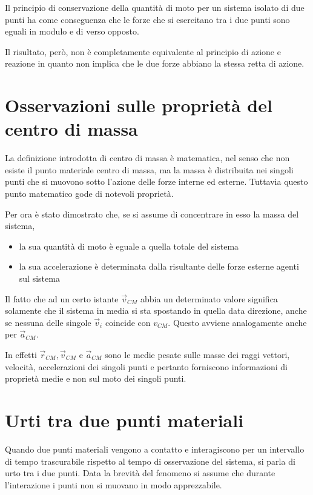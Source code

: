 \documentclass[class=book, crop=false, oneside, 12pt]{standalone}
\begin{document}
Il principio di conservazione della quantità di moto per un sistema isolato di due punti ha come conseguenza che le forze che si esercitano tra i due punti sono eguali in modulo e di verso opposto.

Il risultato, però, non è completamente equivalente al principio di azione e reazione in quanto non implica che le due forze abbiano la stessa retta di azione.

\section{Osservazioni sulle proprietà del centro di massa}

La definizione introdotta di centro di massa è matematica, nel senso che non esiste il punto materiale centro di massa, ma la massa è distribuita nei singoli punti che si muovono sotto l'azione delle forze interne ed esterne. 
Tuttavia questo punto matematico gode di notevoli proprietà.

Per ora è stato dimostrato che, se si assume di concentrare in esso la massa del sistema, 
\begin{itemize}
    \item la sua quantità di moto è eguale a quella totale del sistema
    \item la sua accelerazione è determinata dalla risultante delle forze esterne agenti sul sistema
\end{itemize}

Il fatto che ad un certo istante \(\overrightarrow{v}_{CM}\) abbia un determinato valore significa solamente che il sistema in media si sta spostando in quella data direzione, anche se nessuna delle singole \(\overrightarrow{v}_i\) coincide con \(v_{CM}\).
Questo avviene analogamente anche per \(\overrightarrow{a}_{CM}\).

In effetti \(\overrightarrow{r}_{CM}, \overrightarrow{v}_{CM}\) e \(\overrightarrow{a}_{CM}\) sono le medie pesate sulle masse dei raggi vettori, velocità, accelerazioni dei singoli punti e pertanto forniscono informazioni di proprietà medie e non sul moto dei singoli punti. 

\section{Urti tra due punti materiali}

Quando due punti materiali vengono a contatto e interagiscono per un intervallo di tempo trascurabile rispetto al tempo di osservazione del sistema, si parla di urto tra i due punti.
Data la brevità del fenomeno si assume che durante l'interazione i punti non si muovano in modo apprezzabile.
\end{document}
